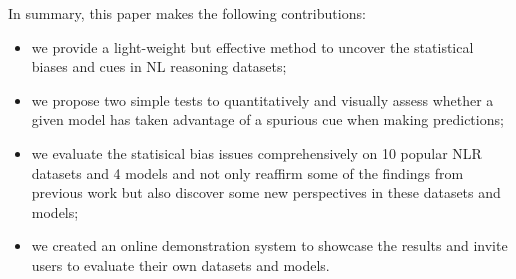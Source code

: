 
In summary, this paper makes the following contributions:
\begin{itemize}
\item we provide a light-weight but effective method to uncover
the statistical biases and cues in NL reasoning datasets;

\item we propose two simple tests to quantitatively and visually
assess whether a given model has taken advantage of a
spurious cue when making predictions;

\item we evaluate the statisical bias issues comprehensively on
10 popular NLR datasets and 4 models and not only reaffirm
some of the findings from previous work but also discover some
new perspectives in these datasets and models;

\item we created an online demonstration system to showcase
the results and invite users to evaluate their own datasets and models.
\end{itemize}








